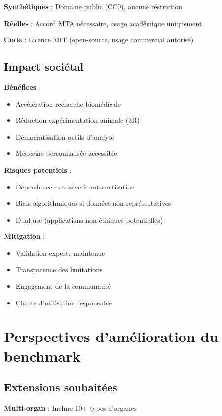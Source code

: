 \textbf{Synthétiques} : Domaine public (CC0), aucune restriction

\textbf{Réelles} : Accord MTA nécessaire, usage académique uniquement

\textbf{Code} : Licence MIT (open-source, usage commercial autorisé)

\subsection{Impact sociétal}

\textbf{Bénéfices} :
\begin{itemize}
    \item Accélération recherche biomédicale
    \item Réduction expérimentation animale (3R)
    \item Démocratisation outils d'analyse
    \item Médecine personnalisée accessible
\end{itemize}

\textbf{Risques potentiels} :
\begin{itemize}
    \item Dépendance excessive à automatisation
    \item Biais algorithmiques si données non-représentatives
    \item Dual-use (applications non-éthiques potentielles)
\end{itemize}

\textbf{Mitigation} :
\begin{itemize}
    \item Validation experte maintenue
    \item Transparence des limitations
    \item Engagement de la communauté
    \item Charte d'utilisation responsable
\end{itemize}

\section{Perspectives d'amélioration du benchmark}

\subsection{Extensions souhaitées}

\textbf{Multi-organ} : Inclure 10+ types d'organes

